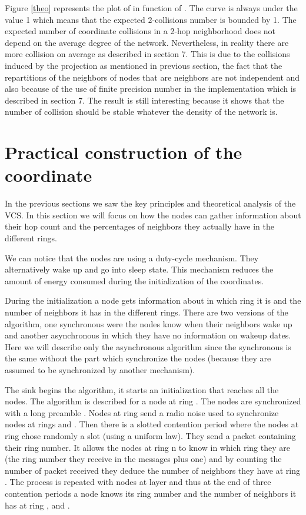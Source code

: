 \documentclass[a4paper]{article}
\begin{document}
Figure \ref{theo} represents the plot of  in function of . The curve is always under the value 1 which means that the expected 2-collisions number is bounded by 1. The expected number of coordinate collisions in a 2-hop neighborhood does not depend on the average degree of the network. Nevertheless, in reality there are more collision on average as described in section 7. This is due to the collisions induced by the projection as mentioned in previous section, the fact that the repartitions of the neighbors of nodes that are neighbors are not independent and also because of the use of finite precision number in the implementation which is described in section 7. The result is still interesting because it shows that the number of collision should be stable whatever the density of the network is.

\section{Practical construction of the coordinate}
In the previous sections we saw the key principles and theoretical analysis of the VCS. In this section we will focus on how the nodes can gather information about their hop count and the percentages of neighbors they actually have in the different rings.

We can notice that the nodes are using a duty-cycle \cite{Polastre04} mechanism. They alternatively wake up and go into sleep state. This mechanism reduces the amount of energy consumed during the initialization of the coordinates.


During the initialization a node gets information about in which ring it is and the number of neighbors it has in the different rings. There are two versions of the algorithm, one synchronous were the nodes know when their neighbors wake up and another asynchronous in which they have no information on wakeup dates. Here we will describe only the asynchronous algorithm since the synchronous is the same without the part which synchronize the nodes (because they are assumed to be synchronized by another mechanism).

The sink begins the algorithm, it starts an initialization that reaches all the nodes. The algorithm is described for a node at ring . The nodes are synchronized with a long preamble \cite{Polastre04}. Nodes at  ring send a radio noise used to synchronize nodes at rings  and . Then there is a slotted contention period where the nodes at ring  chose randomly a slot (using a uniform law). They send a packet containing their ring number. It allows the nodes at ring n to know in which ring they are (the ring number they receive in the messages plus one) and by counting the number of packet received they deduce the number of neighbors they have at ring . The process is repeated with nodes at layer  and  thus at the end of three contention periods a node knows its ring number and the number of neighbors it has at ring ,  and . 
\end{document}
